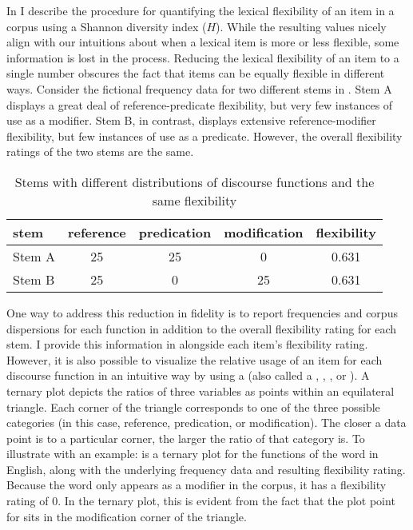 In  I describe the procedure for quantifying the lexical flexibility of an item in a corpus using a Shannon diversity index ($H$). While the resulting values nicely align with our intuitions about when a lexical item is more or less flexible, some information is lost in the process. Reducing the lexical flexibility of an item to a single number obscures the fact that items can be equally flexible in different ways. Consider the fictional frequency data for two different stems in . Stem A displays a great deal of reference-predicate flexibility, but very few instances of use as a modifier. Stem B, in contrast, displays extensive reference-modifier flexibility, but few instances of use as a predicate. However, the overall flexibility ratings of the two stems are the same.

\begin{table}
  \centering
  \caption{Stems with different distributions of discourse functions and the same flexibility}
  \label{tab:equal-flexibility-stems}
  \begin{tabular}{ l c c c c }
    \toprule
    stem   & reference & predication & modification & flexibility\\
    \midrule
    Stem A & 25        & 25          & 0            & 0.631      \\
    Stem B & 25        & 0           & 25           & 0.631      \\
    \bottomrule
  \end{tabular}
\end{table}

One way to address this reduction in fidelity is to report frequencies and corpus dispersions for each function in addition to the overall flexibility rating for each stem. I provide this information in  alongside each item's flexibility rating. However, it is also possible to visualize the relative usage of an item for each discourse function in an intuitive way by using a  (also called a , , , or ). A ternary plot depicts the ratios of three variables as points within an equilateral triangle. Each corner of the triangle corresponds to one of the three possible categories (in this case, reference, predication, or modification). The closer a data point is to a particular corner, the larger the ratio of that category is. To illustrate with an example:  is a ternary plot for the functions of the word  in English, along with the underlying frequency data and resulting flexibility rating. Because the word  only appears as a modifier in the corpus, it has a flexibility rating of $0$. In the ternary plot, this is evident from the fact that the plot point for  sits in the modification corner of the triangle.

